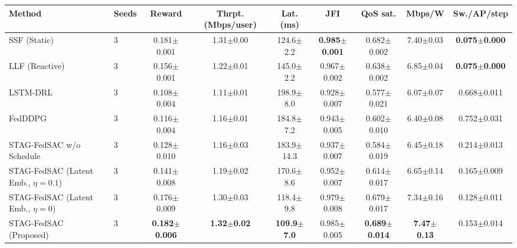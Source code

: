\begin{tabular}{llccccccc}
\toprule
Method & Seeds & Reward & Thrpt. (Mbps/user) & Lat. (ms) & JFI & QoS sat. & Mbps/W & Sw./AP/step \\
\midrule
SSF (Static) & 3 & 0.181{\tiny$\pm$0.001} & 1.31{\tiny$\pm$0.00} & 124.6{\tiny$\pm$2.2} & \textbf{0.985{\tiny$\pm$0.001}} & 0.682{\tiny$\pm$0.002} & 7.40{\tiny$\pm$0.03} & \textbf{0.075{\tiny$\pm$0.000}} \\
LLF (Reactive) & 3 & 0.156{\tiny$\pm$0.001} & 1.22{\tiny$\pm$0.01} & 145.0{\tiny$\pm$2.2} & 0.967{\tiny$\pm$0.002} & 0.638{\tiny$\pm$0.002} & 6.85{\tiny$\pm$0.04} & \textbf{0.075{\tiny$\pm$0.000}} \\
LSTM-DRL & 3 & 0.108{\tiny$\pm$0.004} & 1.11{\tiny$\pm$0.01} & 198.9{\tiny$\pm$8.0} & 0.928{\tiny$\pm$0.007} & 0.577{\tiny$\pm$0.021} & 6.07{\tiny$\pm$0.07} & 0.668{\tiny$\pm$0.011} \\
FedDDPG & 3 & 0.116{\tiny$\pm$0.004} & 1.16{\tiny$\pm$0.01} & 184.8{\tiny$\pm$7.2} & 0.943{\tiny$\pm$0.005} & 0.602{\tiny$\pm$0.010} & 6.40{\tiny$\pm$0.08} & 0.752{\tiny$\pm$0.031} \\
STAG-FedSAC w/o Schedule & 3 & 0.128{\tiny$\pm$0.010} & 1.16{\tiny$\pm$0.03} & 183.9{\tiny$\pm$14.3} & 0.937{\tiny$\pm$0.007} & 0.584{\tiny$\pm$0.019} & 6.45{\tiny$\pm$0.18} & 0.214{\tiny$\pm$0.013} \\
STAG-FedSAC (Latent Emb., $\eta{=}0.1$) & 3 & 0.141{\tiny$\pm$0.008} & 1.19{\tiny$\pm$0.02} & 170.6{\tiny$\pm$8.6} & 0.952{\tiny$\pm$0.007} & 0.614{\tiny$\pm$0.017} & 6.65{\tiny$\pm$0.14} & 0.165{\tiny$\pm$0.009} \\
STAG-FedSAC (Latent Emb., $\eta{=}0$) & 3 & 0.176{\tiny$\pm$0.009} & 1.30{\tiny$\pm$0.03} & 118.4{\tiny$\pm$9.8} & 0.979{\tiny$\pm$0.008} & 0.679{\tiny$\pm$0.017} & 7.34{\tiny$\pm$0.16} & 0.128{\tiny$\pm$0.011} \\
STAG-FedSAC (Proposed) & 3 & \textbf{0.182{\tiny$\pm$0.006}} & \textbf{1.32{\tiny$\pm$0.02}} & \textbf{109.9{\tiny$\pm$7.0}} & 0.985{\tiny$\pm$0.005} & \textbf{0.689{\tiny$\pm$0.014}} & \textbf{7.47{\tiny$\pm$0.13}} & 0.153{\tiny$\pm$0.014} \\
\bottomrule
\end{tabular}

